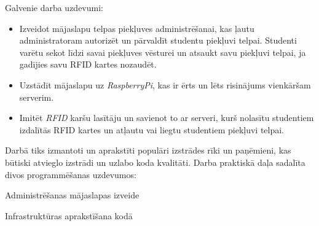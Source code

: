 Galvenie darba uzdevumi:
\begin{itemize}
  \item Izveidot mājaslapu telpas piekļuves administrēšanai, kas ļautu administratoram autorizēt un pārvaldīt studentu piekļuvi telpai. Studenti varētu sekot līdzi savai piekļuves vēsturei un atsaukt savu piekļuvi telpai, ja gadījies savu RFID kartes nozaudēt.
  \item Uzstādīt mājaslapu uz \textit{RaspberryPi}, kas ir ērts un lēts risinājums vienkāršam serverim.
  \item Imitēt \textit{RFID} karšu lasītāju un savienot to ar serveri, kurš nolasītu studentiem izdalītās RFID kartes un atļautu vai liegtu studentiem piekļuvi telpai.
\end{itemize}

Darbā tiks izmantoti un aprakstīti populāri izstrādes rīki un paņēmieni, kas būtiski atvieglo izstrādi un uzlabo koda kvalitāti.
Darba praktiskā daļa sadalīta divos programmēšanas uzdevumos:
\begin{env}
  \item Administrēšanas mājaslapas izveide
  \item Infrastruktūras aprakstīšana kodā
\end{env}


